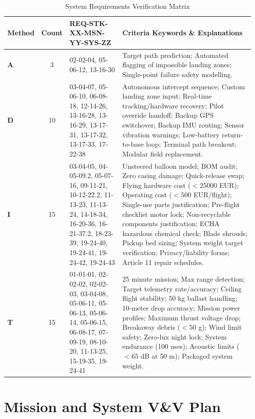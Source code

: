 \begin{table}[H]
\centering
\footnotesize
\caption{System Requirements Verification Matrix}
\label{tab:system_vcrm_consolidated}
\renewcommand{\arraystretch}{1.1}
\setlength{\tabcolsep}{4pt}
\begin{tabularx}{\textwidth}{@{}l c p{} X}
\toprule
\textbf{Method} & \textbf{Count} & \textbf{REQ-STK-XX-MSN-YY-SYS-ZZ} & \textbf{Criteria Keywords \& Explanations} \\
\midrule
\textbf{A} & 3 & 02-02-04, 05-06-12, 13-16-30 & 
Target path prediction; Automated flagging of impossible landing zones; Single-point failure safety modelling. \\
\midrule
\textbf{D}  & 10 & 03-04-07, 05-06-10, 06-08-18, 12-14-26, 13-16-28, 13-16-29, 13-17-31, 13-17-32, 13-17-33, 17-22-38 & 
Autonomous intercept sequence; Custom landing zone input; Real-time tracking/hardware recovery; Pilot override handoff; Backup GPS switchover; Backup IMU routing; Sensor vibration warnings; Low-battery return-to-base loop; Terminal path breakout; Modular field replacement. \\
\midrule
\textbf{I}  & 15 & 03-04-05, 04-05-09.2, 05-07-16, 09-11-21, 10-12-22.2, 11-13-23, 11-13-24, 14-18-34, 16-20-36, 16-21-37.2, 18-23-39, 19-24-40, 19-24-41, 19-24-42, 19-24-43 & 
Unsteered balloon model; BOM audit; Zero casing damage; Quick-release swap; Flying hardware cost ($< 25000$ EUR); Operating cost ($< 500$ EUR/flight); Single-use parts justification; Pre-flight checklist motor lock; Non-recyclable components justification; ECHA hazardous chemical check; Blade shrouds; Pickup bed sizing; System weight target verification; Privacy/liability forms; Article 11 repair schedules. \\
\midrule
\textbf{T}  & 15 & 01-01-01, 02-02-02, 02-02-03, 03-04-08, 05-06-11, 05-06-13, 05-06-14, 05-06-15, 06-08-17, 07-09-19, 08-10-20, 11-13-25, 15-19-35, 19-24-41 & 
25 minute mission; Max range detection; Target telemetry rate/accuracy; Ceiling flight stability; 50 kg ballast handling; 10-meter drop accuracy; Mission power profiles; Maximum thrust voltage drop; Breakaway debris ($< 50$ g); Wind limit safety; Zero-lux night lock; System endurance (100 uses); Acoustic limits ($< 65$ dB at 50 m); Packaged system weight. \\
\bottomrule
\end{tabularx}
\end{table}




\section{Mission and System V\&V Plan}



